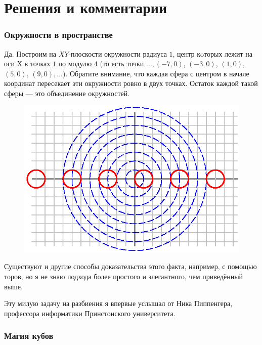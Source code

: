 \section*{Решения и комментарии}

\subsubsection*{Окружности в пространстве}%

Да.
Построим на $XY$-плоскости окружности радиуса $1$, центр кoторых лежит на оси $Х$ в точках $1$ по модулю $4$ (то есть точки $\dots, (-7,0)$, $(-3,0)$, $(1,0)$, $(5,0)$, $(9,0),\dots$).
Обратите внимание, что каждая сфера с центром в начале координат пересекает эти окружности ровно в двух точках.
Остаток каждой такой сферы --- это объединение окружностей.
\heart

\begin{figure}[h!]
\centering
\includegraphics[scale=0.7]{Figs/Geometry/ring}
\end{figure} 

Существуют и другие способы доказательства этого факта, например, с помощью торов, но я не знаю подхода более простого и элегантного, чем приведённый выше.

Эту милую задачу на разбиения я впервые услышал от Ника Пиппенгера, %
профессора информатики Принстонского университета.

\subsubsection*{Магия кубов}%

